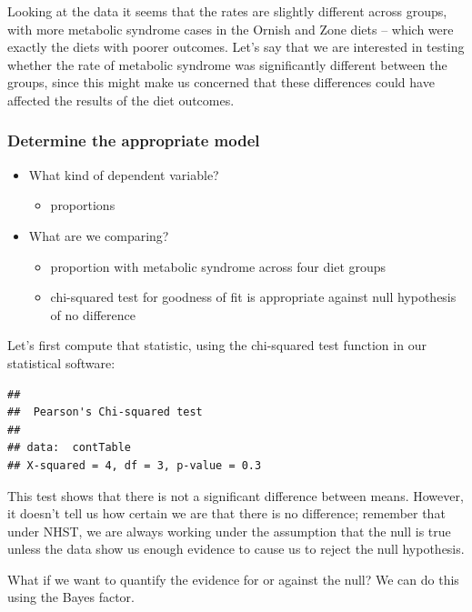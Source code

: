 \documentclass[12pt,]{book}
\providecommand{\tightlist}{%
  \setlength{\itemsep}{0pt}\setlength{\parskip}{0pt}}
\theoremstyle{definition}
\theoremstyle{definition}
\theoremstyle{definition}
\theoremstyle{remark}
\begin{document}
Looking at the data it seems that the rates are slightly different across groups, with more metabolic syndrome cases in the Ornish and Zone diets -- which were exactly the diets with poorer outcomes. Let's say that we are interested in testing whether the rate of metabolic syndrome was significantly different between the groups, since this might make us concerned that these differences could have affected the results of the diet outcomes.

\hypertarget{determine-the-appropriate-model-1}{%
\subsubsection{Determine the appropriate model}\label{determine-the-appropriate-model-1}}

\begin{itemize}
\tightlist
\item
  What kind of dependent variable?

  \begin{itemize}
  \tightlist
  \item
    proportions
  \end{itemize}
\item
  What are we comparing?

  \begin{itemize}
  \tightlist
  \item
    proportion with metabolic syndrome across four diet groups
  \item
    chi-squared test for goodness of fit is appropriate against null hypothesis of no difference
  \end{itemize}
\end{itemize}

Let's first compute that statistic, using the chi-squared test function in our statistical software:

\begin{verbatim}
## 
##  Pearson's Chi-squared test
## 
## data:  contTable
## X-squared = 4, df = 3, p-value = 0.3
\end{verbatim}

This test shows that there is not a significant difference between means. However, it doesn't tell us how certain we are that there is no difference; remember that under NHST, we are always working under the assumption that the null is true unless the data show us enough evidence to cause us to reject the null hypothesis.

What if we want to quantify the evidence for or against the null? We can do this using the Bayes factor.
\end{document}

